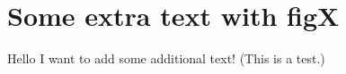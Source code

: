 







\section*{Some extra text with figX}

Hello I want to add some additional text! (This is a test.)